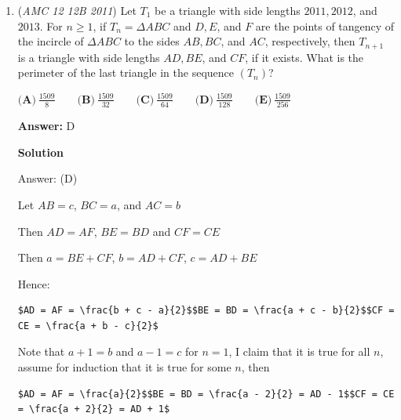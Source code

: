 \begin{enumerate}
 


 



\textbf{Solution 3 (whee!)}

Let the 2 digit number be $10a+b$. We know $x+y=20a+2b$ and $\sqrt{xy} = 10b+a$.

 
Thus. $x^2+2xy+y^2 = 400a^2+80ab+4b^2$ and $xy = 100b^2+20ab+a^2$. Notice that $|x-y| = \sqrt{(x-y)^2}$. We know that $(x-y)^2 = (x+y)^2-4xy = 396a^2-396b^2$. Then, $|x-y| = 6\sqrt{11}\cdot \sqrt{b^2-a^2}$. Clearly, $|x-y|$ must be a multiple of 11, so the only possible answer is $\boxed{\textbf{(D) }66}$.

 -skibbysiggy

 


	\item (\textit{AMC 12 12B 2011}) Let $T_1$ be a triangle with side lengths $2011, 2012$, and $2013$. For $n \geq 1$, if $T_n = \Delta ABC$ and $D, E$, and $F$ are the points of tangency of the incircle of $\Delta ABC$ to the sides $AB, BC$, and $AC$, respectively, then $T_{n+1}$ is a triangle with side lengths $AD, BE$, and $CF$, if it exists. What is the perimeter of the last triangle in the sequence $\left(T_n\right)$?


 $\textbf{(A)}\ \frac{1509}{8} \qquad \textbf{(B)}\  \frac{1509}{32} \qquad \textbf{(C)}\  \frac{1509}{64} \qquad \textbf{(D)}\  \frac{1509}{128} \qquad \textbf{(E)}\  \frac{1509}{256}$

 \textbf{Answer: }D



\textbf{Solution}

Answer: (D)

 Let $AB = c$, $BC = a$, and $AC = b$

 Then $AD = AF$, $BE = BD$ and $CF = CE$

 Then $a = BE + CF$, $b = AD + CF$, $c = AD + BE$

 Hence:

 \begin{verbatim}
$AD = AF = \frac{b + c - a}{2}$$BE = BD = \frac{a + c - b}{2}$$CF = CE = \frac{a + b - c}{2}$
\end{verbatim}

Note that $a + 1 = b$ and $a - 1 = c$ for $n = 1$, I claim that it is true for all $n$, assume for induction that it is true for some $n$, then

 \begin{verbatim}
$AD = AF = \frac{a}{2}$$BE = BD = \frac{a - 2}{2} = AD - 1$$CF = CE = \frac{a + 2}{2} = AD + 1$
\end{verbatim}


\end{enumerate}
